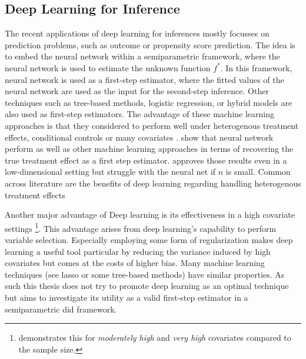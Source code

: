 \subsection{Deep Learning for Inference}
The recent applications of deep learning for inferences mostly focusses on prediction problems, such as outcome or propensity score prediction.
The idea is to embed the neural network within a semiparametric framework, where the neural network is used to estimate the unknown function $f^*$.
In this framework, neural network is used as a first-step estimator, where the fitted values of the neural network are used as the input for the second-step inference. %
Other techniques such as tree-based methods, logistic regression, or hybrid models are also used as first-step estimators.
The advantage of these machine learning approaches is that they considered to perform well under heterogenous treatment effects, conditional controls or many covariates \citep{belloni2017program}.
\citet{belloni2017program} show that neural network perform as well as other machine learning approaches in terms of recovering the true treatment effect as a first step estimator.
\citet{chernozhukovDoubleDebiasedMachine2018} approves those results even in a low-dimensional setting but struggle with the neural net if $n$ is small.
Common across literature are the benefits of deep learning regarding handling heterogenous treatment effects \citep[see][]{DeepLearningIndividual2021,belloni2017program,chernozhukovDoubleDebiasedMachine2018}

Another major advantage of Deep learning is its effectiveness in a high covariate settings \citep{chernozhukov2022automatic}\footnote[3]{\citet{belloni2017program} demonstrates this for \textit{moderately high} and \textit{very high} covariates compared to the sample size.}.
This advantage arises from deep learning's capability to perform variable selection.
Especially employing some form of regularization makes deep learning a useful tool \citep{chernozhukovDoubleDebiasedMachine2018} particular by reducing the variance induced by high covariates but comes at the costs of higher bias.
Many machine learning techniques (see lasso or some tree-based methods) have similar properties.
As such this thesis does not try to promote deep learning as an optimal technique but aims to investigate its utility as a valid first-step estimator in a semiparametric \ac{did} framework.

